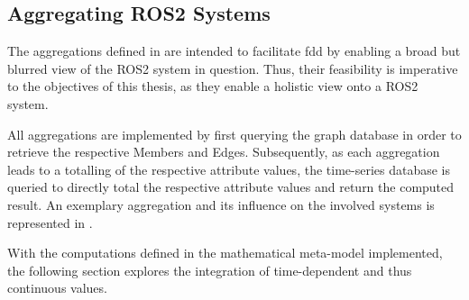 \vspace{-.125cm}
    \subsection{Aggregating ROS2 Systems} \label{subsec:eval:aggregation}
\vspace{-.125cm}
        The aggregations defined in  are intended to facilitate \acl{fdd} by enabling a broad but blurred view of the ROS2 system in question. Thus, their feasibility is imperative to the objectives of this thesis, as they enable a holistic view onto a ROS2 system.

        All aggregations are implemented by first querying the graph database in order to retrieve the respective Members and Edges. Subsequently, as each aggregation leads to a totalling of the respective attribute values, the time-series database is queried to directly total the respective attribute values and return the computed result.\newline
        An exemplary aggregation and its influence on the involved systems is represented in .

        With the computations defined in the mathematical meta-model implemented, the following section explores the integration of time-dependent and thus continuous values.


